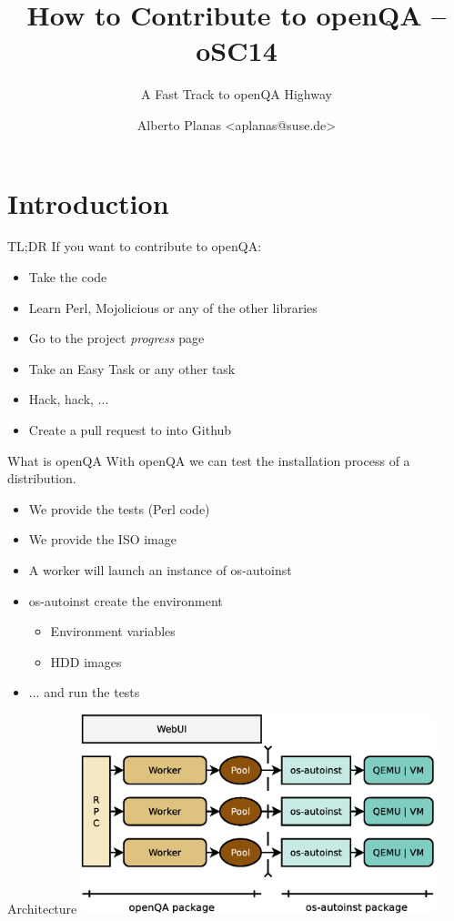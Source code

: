 \documentclass{beamer}
\author{Alberto Planas <aplanas@suse.de>\newline {\small openSUSE Team}}
\title{How to Contribute to openQA -- oSC14}
\subtitle{A Fast Track to openQA Highway}
\begin{document}
\begin{frame}[t,plain]
  \titlepage
\end{frame}


\section{Introduction}

\begin{frame}{TL;DR}
  If you want to contribute to openQA:
  \begin{itemize}
  \item Take the code
  \item Learn Perl, Mojolicious or any of the other libraries
  \item Go to the project {\em progress} page
  \item Take an Easy Task or any other task
  \item Hack, hack, ...
  \item Create a pull request to into Github
  \end{itemize}
\end{frame}

\begin{frame}{What is openQA}
  With openQA we can test the installation process of a distribution.
  \begin{itemize}
  \item We provide the tests (Perl code)
  \item We provide the ISO image
  \item A worker will launch an instance of os-autoinst
  \item os-autoinst create the environment
    \begin{itemize}
    \item Environment variables
    \item HDD images
    \end{itemize}
  \item ... and run the tests
  \end{itemize}
\end{frame}

\begin{frame}{Architecture}
  \includegraphics[height=5.8cm,width=10.3cm]{arch}
\end{frame}
\end{document}
